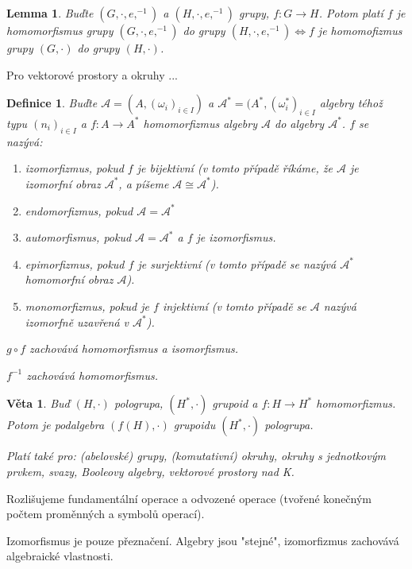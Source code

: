 \documentclass[a4paper, 11pt]{report}
\newtheorem{mydef}{Definice}[chapter]
\newtheorem{veta}{Věta}[chapter]
\newtheorem{lemma}{Lemma}[chapter]
\begin{document}
\begin{lemma}
Buďte $(G, \cdot, e, ^{-1})$ a $(H, \cdot, e, ^{-1})$ grupy, $f: G \to H$. Potom platí $f$ je homomorfismus grupy $(G, \cdot, e, ^{-1})$ do grupy $(H, \cdot, e, ^{-1}) \Leftrightarrow f$ je homomofizmus grupy $(G, \cdot)$ do grupy $(H, \cdot)$.
\end{lemma}

Pro vektorové prostory a okruhy ...

\begin{mydef}
Buďte $\mathcal{A} = (A, (\omega_i)_{i \in I})$ a $\mathcal{A}^* = (A^*, (\omega^*_i)_{i \in I}$ algebry téhož typu $(n_i)_{i \in I}$ a $f: A \to A^*$ homomorfizmus algebry $\mathcal{A}$ do algebry $\mathcal{A}^*$. $f$ se nazývá:
\begin{enumerate}
	\item \emph{izomorfizmus}, pokud $f$ je bijektivní (v tomto případě říkáme, že $\mathcal{A}$ je izomorfní obraz $\mathcal{A}^*$, a píšeme $\mathcal{A} \cong \mathcal{A}^*$).
	\item \emph{endomorfizmus}, pokud $\mathcal{A} = \mathcal{A}^*$
	\item \emph{automorfismus}, pokud $\mathcal{A} = \mathcal{A}^*$ a $f$ je izomorfismus.
	\item \emph{epimorfizmus}, pokud $f$ je surjektivní (v tomto případě se nazývá $\mathcal{A}^*$ homomorfní obraz $\mathcal{A}$).
	\item \emph{monomorfizmus}, pokud je $f$ injektivní (v tomto případě se $\mathcal{A}$ nazývá izomorfně uzavřená v $\mathcal{A}^*$).
\end{enumerate}

$g \circ f$ zachovává homomorfismus a isomorfismus.

$f^{-1}$ zachovává homomorfismus.
\end{mydef}

\begin{veta}
Buď $(H, \cdot)$ pologrupa, $(H^*, \cdot)$ grupoid a $f: H \to H^*$ homomorfizmus. Potom je podalgebra $(f(H), \cdot)$ grupoidu $(H^*, \cdot)$ pologrupa.

Platí také pro: (abelovské) grupy, (komutativní) okruhy, okruhy s jednotkovým prvkem, svazy, Booleovy algebry, vektorové prostory nad K.
\end{veta}

Rozlišujeme fundamentální operace a odvozené operace (tvořené konečným počtem proměnných a symbolů operací).

Izomorfismus je pouze přeznačení. Algebry jsou "stejné", izomorfizmus zachovává algebraické vlastnosti.
\end{document}
